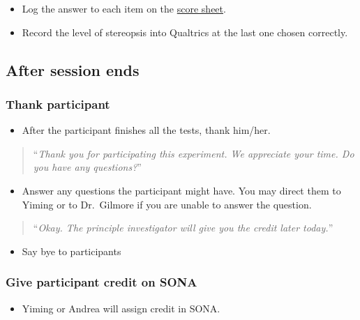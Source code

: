 \documentclass[]{article}
\providecommand{\tightlist}{%
  \setlength{\itemsep}{0pt}\setlength{\parskip}{0pt}}
\begin{document}
\begin{itemize}
\tightlist
\item
  Log the answer to each item on the
  \href{vision-screening-score-sheet.html}{score sheet}.
\item
  Record the level of stereopsis into Qualtrics at the last one chosen
  correctly.
\end{itemize}

\subsection{After session ends}\label{after-session-ends}

\subsubsection{Thank participant}\label{thank-participant}

\begin{itemize}
\tightlist
\item
  After the participant finishes all the tests, thank him/her.
\end{itemize}

\begin{quote}
``\emph{Thank you for participating this experiment. We appreciate your
time. Do you have any questions?}''
\end{quote}

\begin{itemize}
\tightlist
\item
  Answer any questions the participant might have. You may direct them
  to Yiming or to Dr.~Gilmore if you are unable to answer the question.
\end{itemize}

\begin{quote}
``\emph{Okay. The principle investigator will give you the credit later
today.}''
\end{quote}

\begin{itemize}
\tightlist
\item
  Say bye to participants
\end{itemize}

\subsubsection{Give participant credit on
SONA}\label{give-participant-credit-on-sona}

\begin{itemize}
\tightlist
\item
  Yiming or Andrea will assign credit in SONA.
\end{itemize}
\end{document}
